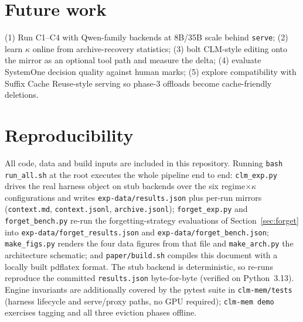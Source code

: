 \documentclass[10pt]{article}
\begin{document}
\section{Future work}
(1) Run C1--C4 with Qwen-family backends at 8B/35B scale behind \texttt{serve}; (2) learn $\kappa$ online from archive-recovery statistics; (3) bolt CLM-style editing onto the mirror as an optional tool path and measure the delta; (4) evaluate SystemOne decision quality against human marks; (5) explore compatibility with Suffix Cache Reuse-style serving so phase-3 offloads become cache-friendly deletions.

\section*{Reproducibility}
All code, data and build inputs are included in this repository. Running
\texttt{bash run\_all.sh} at the root executes the whole pipeline end to end:
\texttt{clm\_exp.py} drives the real harness object on stub backends over the
six regime$\times\kappa$ configurations and writes \texttt{exp-data/results.json}
plus per-run mirrors (\texttt{context.md}, \texttt{context.jsonl},
\texttt{archive.jsonl}); \texttt{forget\_exp.py} and \texttt{forget\_bench.py}
re-run the forgetting-strategy evaluations of Section~\ref{sec:forget} into
\texttt{exp-data/forget\_results.json} and \texttt{exp-data/forget\_bench.json}; \texttt{make\_figs.py} renders the four data figures
from that file and \texttt{make\_arch.py} the architecture schematic; and
\texttt{paper/build.sh} compiles this document with a locally built pdflatex
format. The stub backend is deterministic, so re-runs reproduce the committed
\texttt{results.json} byte-for-byte (verified on Python~3.13). Engine
invariants are additionally covered by the pytest suite in
\texttt{clm-mem/tests} (harness lifecycle and serve/proxy paths, no GPU
required); \texttt{clm-mem demo} exercises tagging and all three eviction
phases offline.
\end{document}
